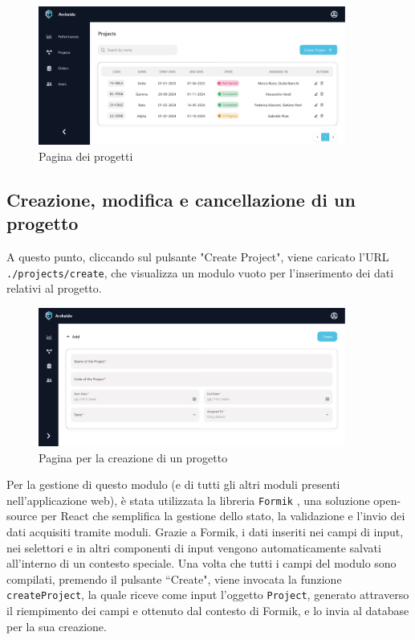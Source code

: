 \documentclass[target=bach,aauheader=,style=]{thud}
\begin{document}
\begin{figure}[H]
    \centering
    \includegraphics[width=0.9\textwidth]{img/interfacce/table_project.pdf} 
    \caption{Pagina dei progetti}
    \label{tabella_progetti}
\end{figure}

\subsection{Creazione, modifica e cancellazione di un progetto}
A questo punto, cliccando sul pulsante "Create Project", viene caricato l'URL \texttt{./projects/create}, che visualizza un modulo vuoto per l'inserimento dei dati relativi al progetto. 

\begin{figure}[H]
    \centering
    \includegraphics[width=0.9\textwidth]{img/interfacce/table_add.pdf} 
    \caption{Pagina per la creazione di un progetto}
\end{figure}

\noindent Per la gestione di questo modulo (e di tutti gli altri moduli presenti nell'applicazione web), è stata utilizzata la libreria \texttt{Formik} \cite{formik}, una soluzione open-source per React che semplifica la gestione dello stato, la validazione e l'invio dei dati acquisiti tramite moduli. Grazie a Formik, i dati inseriti nei campi di input, nei selettori e in altri componenti di input vengono automaticamente salvati all'interno di un contesto speciale. Una volta che tutti i campi del modulo sono compilati, premendo il pulsante ``Create", viene invocata la funzione \texttt{createProject}, la quale riceve come input l'oggetto \texttt{Project}, generato attraverso il riempimento dei campi e ottenuto dal contesto di Formik, e lo invia al database per la sua creazione.
\end{document}
